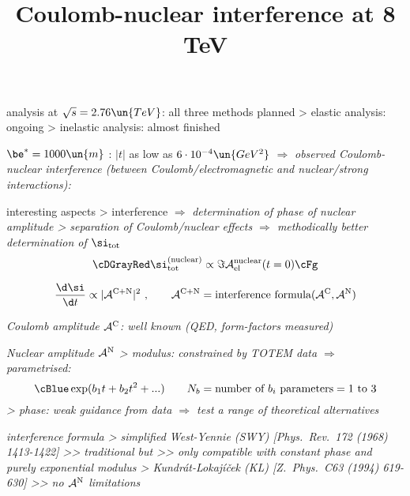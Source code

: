 
\vskip-6mm

\> analysis at $\sqrt s = 2.76\un{TeV}$: all three methods planned
\>> elastic analysis: ongoing
\>> inelastic analysis: almost finished

\newpage %
\title{Coulomb-nuclear interference at 8 TeV}

\> $\be^* = 1000\un{m}$ : \cBlack $|t|$ as low as $6\cdot10^{-4}\un{GeV^2}$ $\Rightarrow$ \em{observed Coulomb-nuclear interference}
\cBlack (between Coulomb/electromagnetic and nuclear/strong interactions):

\vfil
{}

\vskip-5mm

\> interesting aspects
\>> interference $\Rightarrow$ \em{determination of phase} of nuclear amplitude
\>> separation of Coulomb/nuclear effects $\Rightarrow$ \em{methodically better determination of $\si_{\rm tot}$}
$$\cDGrayRed\si_{\rm tot}^{\rm(nuclear)} \propto \Im {\cal A_{\rm el}^{\rm nuclear}}(t = 0)\cFg$$


\newpage %

\vskip-3mm

\cBlue
$${\d\si\over \d t} \propto |{\cal A}^{\rm C+N}|^2\ ,\qquad
{\cal A}^{\rm C+N} = \hbox{interference formula}({\cal A^{\rm C}}, {\cal A}^{\rm N})$$
\vskip1mm

\> \em{Coulomb amplitude ${\cal A}^{\rm C}$}: well known (QED, form-factors measured)

\> \em{Nuclear amplitude ${\cal A}^{\rm N}$}
\>> \em{modulus}: constrained by TOTEM data $\Rightarrow$ parametrised:
$$\cBlue\exp(b_1 t + b_2 t^2 + ...)\qquad N_b = \hbox{number of $b_i$ parameters} = 1 \hbox{ to }3$$
\>> \em{phase}: weak guidance from data $\Rightarrow$ test a range of theoretical alternatives 

\> \em{interference formula}
\>> \cBlue simplified West-Yennie \cBlack(SWY) [Phys.~Rev.~172 (1968) 1413-1422]
\>>> traditional but
\>>> only compatible with constant phase and purely exponential modulus
\>> \cBlue Kundrát-Lokajíček \cBlack(KL) [Z.~Phys.~C63 (1994) 619-630]
\>>> no ${\cal A}^{\rm N}$ limitations

